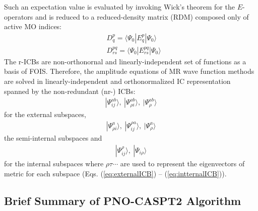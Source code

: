 \documentclass[aip,jcp,amsmath]{revtex4-1}
\begin{document}
%
Such an expectation value is evaluated by invoking Wick's theorem for the $E$-operators and is reduced to a reduced-density matrix (RDM) composed only of active MO indices:
%
\begin{align}
  &D^{p}_{q} = \langle\Psi_0|E^{p}_{q}|\Psi_0\rangle  \\
  &D^{pq}_{rs} = \langle\Psi_0|E^{pq}_{rs}|\Psi_0\rangle
\end{align}
%
The r-ICBs are non-orthonornal and linearly-independent set of functions as a basis of FOIS.
%
Therefore, the amplitude equations of MR wave function methods are solved in linearly-independent and orthonormalized IC representation spanned by the non-redundant (nr-) ICBs:
%
\begin{align}
  |\Psi_{ij}^{ab}\rangle,\ |\Psi_{\rho i}^{ab}\rangle,\ |\Psi_{\rho}^{ab}\rangle 
\end{align}
%
for the external subspaces,
%
\begin{align}
  |\Psi_{\rho i}^{a}\rangle,\ |\Psi_{ij}^{\rho a}\rangle,\ |\Psi_{\rho}^{a}\rangle
\end{align}
%
the semi-internal subspaces and
%
\begin{align}
  |\Psi_{ij}^{\rho}\rangle,\ |\Psi_{i\rho}\rangle
\end{align}
%
for the internal subspaces where $\rho\tau\cdots$ are used to represent the eigenvectors of metric for each subspace (Eqs. (\ref{eq:externalICB}) -- (\ref{eq:intternalICB})).

\subsection{Brief Summary of PNO-CASPT2 Algorithm}
\end{document}

